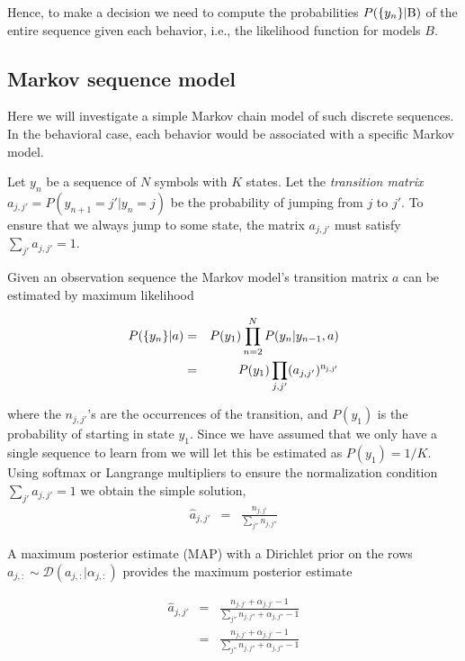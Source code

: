\documentclass[A4,12pt]{article}    %
\begin{document}
Hence, to make a decision we need to compute the probabilities $P(\{y_n\}| {\rm B})$ of the entire sequence given each behavior, i.e., the likelihood function for models $B$.

\subsection*{Markov sequence model}

Here we will investigate a simple Markov chain model of such discrete sequences. In the behavioral case, each behavior would be associated with a specific Markov model.

Let $y_n$ be a sequence of $N$ symbols with $K$ states.
Let the \emph{transition matrix} $a_{j,j'} = P(y_{n+1} = j'| y_n = j)$ be the probability of jumping from $j$ to $j'$.
To ensure that we always jump to some state, the matrix $a_{j,j'}$ must satisfy $\sum_{j'}a_{j,j'} = 1$.

Given an observation sequence the Markov model's transition matrix $a$ can be estimated by maximum likelihood

\begin{eqnarray}
P(\{y_n\}|a) & = & P(y_1)\prod_{n=2}^{N}P(y_{n}|y_{n-1},a)
\nonumber\\ & = & P(y_1) \prod_{j,j'}(a_{j,j'})^{\rm
n_{j,j'}}\nonumber
\end{eqnarray}

where the $n_{j,j'}$'s are the occurrences of the transition, and $P(y_1)$
is the probability of starting in state $y_1$. Since we have assumed that we only have
a single sequence to learn from we will let this be estimated as $P(y_1)
= 1/K$. Using softmax or Langrange multipliers to ensure the normalization condition
$\sum_{j'}a_{j,j'} = 1$ we obtain the simple solution,
\begin{eqnarray}
\widehat{a}_{j,j'} & =&
\frac{n_{j,j'}}{\sum_{j''}n_{j,j''}}\nonumber
\end{eqnarray}

A maximum posterior estimate (MAP) with a Dirichlet prior on the rows $a_{j,:} \sim \mathcal{D}(a_{j,:} | \alpha_{j,:})$ provides the maximum posterior estimate

\begin{eqnarray}
\widehat{a}_{j,j'} & = & \frac{n_{j,j'}+\alpha_{j,j'}-1}{\sum_{j''}n_{j,j''}+\alpha_{j,j''}-1}\nonumber \\
& = & \frac{n_{j,j'}+\alpha_{j,j'}-1}{\sum_{j''}n_{j,j''}+\alpha_{j,j''}-1}\nonumber
\end{eqnarray}
\end{document}
